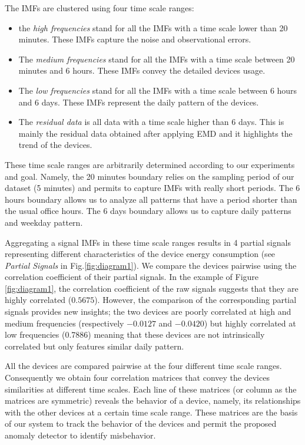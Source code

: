 The IMFs are clustered using four time scale ranges: 
\begin{itemize}
 \item the \emph{high frequencies} stand for all the IMFs with a time scale lower than 20 minutes. These IMFs capture the noise and observational errors.
 \item The \emph{medium frequencies} stand for all the IMFs with a time scale between 20 minutes and 6 hours. These IMFs convey the detailed devices usage.
 \item The \emph{low frequencies} stand for all the IMFs with a time scale between 6 hours and 6 days. These IMFs represent the daily pattern of the devices.
 \item The \emph{residual data} is all data with a time scale higher than 6 days. This is mainly the residual data obtained after applying EMD and it highlights the trend of the devices.
\end{itemize}

These time scale ranges are arbitrarily determined according to our experiments and goal.
Namely, the 20 minutes boundary relies on the sampling period of our dataset (5 minutes) and permits to capture IMFs with really short periods.
The 6 hours boundary allows us to analyze all patterns that have a period shorter than the usual office hours.
The 6 days boundary allows us to capture daily patterns and weekday pattern.

Aggregating a signal IMFs in these time scale ranges results in 4 partial signals representing different characteristics of the device energy consumption (see \emph{Partial Signals} in Fig.\ref{fig:diagram1}).
We compare the devices pairwise using the correlation coefficient of their partial signals.
In the example of Figure \ref{fig:diagram1}, the correlation coefficient of the raw signals suggests that they are highly correlated ($0.5675$). 
However, the comparison of the corresponding partial signals provides new insights;
the two devices are poorly correlated at high and medium frequencies (respectively $-0.0127$ and $-0.0420$) but highly correlated at low frequencies (0.7886) meaning that these devices are not intrinsically correlated but only features similar daily pattern.

All the devices are compared pairwise at the four different time scale ranges.
Consequently we obtain four correlation matrices that convey the devices similarities at different time scales.
Each line of these matrices (or column as the matrices are symmetric) reveals the behavior of a device, namely, its relationships with the other devices at a certain time scale range.
These matrices are the basis of our system to track the behavior of the devices and permit the proposed anomaly detector to identify misbehavior.


